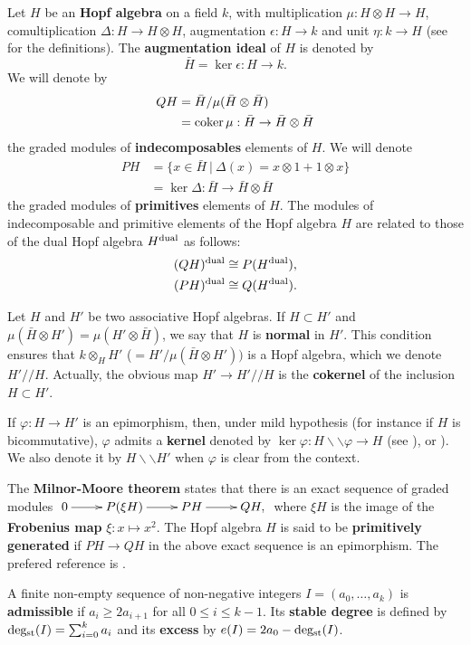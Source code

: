 Let $H$ be an {\bf Hopf algebra} on a field $k$, with multiplication $\mu:H\otimes H\to H$, comultiplication $\Delta:H\to H\otimes H$, augmentation $\epsilon:H\to k$ and unit $\eta:k\to H$ (see \cite{MM65} for the definitions). The {\bf augmentation ideal} of $H$ is denoted by
$$
\bar{H}=\ker\epsilon:H\to k.
$$ We will denote  by
\begin{align*}
QH&=\bar{H}/\mu(\bar{H}\otimes\bar{H})\\
&=\operatorname{coker} \mu:\bar{H}\to\bar{H}\otimes\bar{H}
\end{align*}
the graded modules of {\bf indecomposables} elements of $H$. We will denote
\begin{align*}
PH&=\{x\in\bar{H}\ |\ \Delta(x)=x\otimes1+1\otimes x\}\\
&=\ker \Delta:\bar{H}\to\bar{H}\otimes\bar{H}
\end{align*}
the graded modules of {\bf primitives} elements of $H$.  
The modules of indecomposable and primitive elements of the Hopf algebra $H$ are related to those of the dual Hopf algebra $H^{\operatorname{dual}}$ as follows:
\begin{align*}
(QH)^{\operatorname{dual}}&\cong P(H^{\operatorname{dual}}),\\
(PH)^{\operatorname{dual}}&\cong Q(H^{\operatorname{dual}}).
\end{align*}

Let $H$ and $H'$ be two associative Hopf algebras. If $H\subset H'$ and $\mu(\bar{H}\otimes H')=\mu(H'\otimes\bar{H})$, we say that $H$ is {\bf normal} in $H'$. This condition ensures that $k\otimes_{H}H'$ ($=H'/\mu(\bar{H}\otimes H'))$ is a Hopf algebra, which we denote $H'//H$. Actually, the obvious map $H'\to H'//H$ is the {\bf cokernel} of the inclusion $H\subset H'$.

If $\varphi:H\to H'$ is an epimorphism, then, under mild hypothesis (for instance if $H$ is bicommutative), $\varphi$ admits a {\bf kernel} denoted by $\ker\varphi:H\backslash\backslash\varphi\to H$ (see \cite[3.5. Definitions, pp. 223-224]{MM65}), \cite[3.6. Proposition, p. 224]{MM65} or \cite[Proposition 2.1 (2), pp. 64-65]{Sm70}). We also denote it by $H\backslash\backslash H'$ when $\varphi$ is clear from the context. 

The {\bf Milnor-Moore theorem}\label{t:Milnor-Moore} states that there is an exact sequence of graded modules
$\xymatrix{
0\ar[r] &P(\xi H)\ar[r] &PH\ar[r] &QH,
}$ where $\xi H$ is the image of the {\bf Frobenius map} $\xi:x\mapsto x^2$. The Hopf algebra $H$ is said to be {\bf primitively generated} if $PH\to QH$ in the above exact sequence is an epimorphism. The prefered reference is \cite{MM65}.

A finite non-empty sequence of non-negative integers $I=(a_0,\dots,a_k)$ is {\bf admissible} if $a_i\geq2a_{i+1}$ for all $0\leq i\leq k-1$. Its {\bf stable degree} is defined by $\operatorname{deg_{st}}(I)=\sum_{i=0}^k a_i$ and its {\bf excess} by $e(I)=2a_0-\operatorname{deg_{st}}(I)$.

\endinput